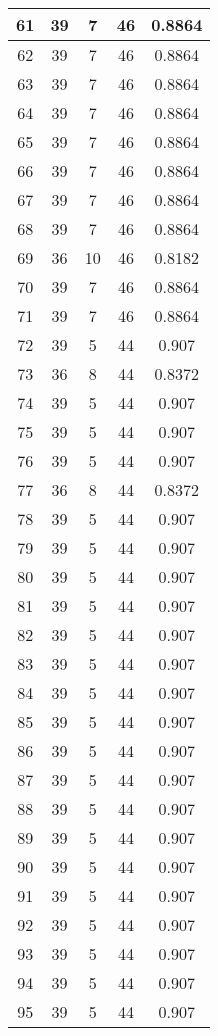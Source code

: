 \documentclass[letterpaper, 12pt]{article}
\begin{document}
\begin{longtable}{|c|c|c|c|c|}
61 & 39 & 7 & 46 & 0.8864 \\
\hline
62 & 39 & 7 & 46 & 0.8864 \\
\hline
63 & 39 & 7 & 46 & 0.8864 \\
\hline
64 & 39 & 7 & 46 & 0.8864 \\
\hline
65 & 39 & 7 & 46 & 0.8864 \\
\hline
66 & 39 & 7 & 46 & 0.8864 \\
\hline
67 & 39 & 7 & 46 & 0.8864 \\
\hline
68 & 39 & 7 & 46 & 0.8864 \\
\hline
69 & 36 & 10 & 46 & 0.8182 \\
\hline
70 & 39 & 7 & 46 & 0.8864 \\
\hline
71 & 39 & 7 & 46 & 0.8864 \\
\hline
72 & 39 & 5 & 44 & 0.907 \\
\hline
73 & 36 & 8 & 44 & 0.8372 \\
\hline
74 & 39 & 5 & 44 & 0.907 \\
\hline
75 & 39 & 5 & 44 & 0.907 \\
\hline
76 & 39 & 5 & 44 & 0.907 \\
\hline
77 & 36 & 8 & 44 & 0.8372 \\
\hline
78 & 39 & 5 & 44 & 0.907 \\
\hline
79 & 39 & 5 & 44 & 0.907 \\
\hline
80 & 39 & 5 & 44 & 0.907 \\
\hline
81 & 39 & 5 & 44 & 0.907 \\
\hline
82 & 39 & 5 & 44 & 0.907 \\
\hline
83 & 39 & 5 & 44 & 0.907 \\
\hline
84 & 39 & 5 & 44 & 0.907 \\
\hline
85 & 39 & 5 & 44 & 0.907 \\
\hline
86 & 39 & 5 & 44 & 0.907 \\
\hline
87 & 39 & 5 & 44 & 0.907 \\
\hline
88 & 39 & 5 & 44 & 0.907 \\
\hline
89 & 39 & 5 & 44 & 0.907 \\
\hline
90 & 39 & 5 & 44 & 0.907 \\
\hline
91 & 39 & 5 & 44 & 0.907 \\
\hline
92 & 39 & 5 & 44 & 0.907 \\
\hline
93 & 39 & 5 & 44 & 0.907 \\
\hline
94 & 39 & 5 & 44 & 0.907 \\
\hline
95 & 39 & 5 & 44 & 0.907 \\

\end{longtable}
\end{document}
